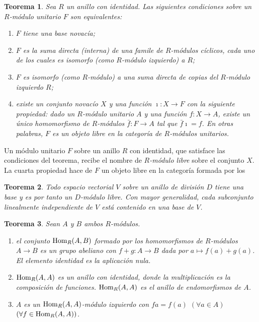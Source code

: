 \documentclass{report}
\newcommand{\Hom}{\textnormal{Hom}}
\newtheorem{theorem}{Teorema}
\begin{document}
  \newpage

  \begin{theorem}
    \label{theorem:freeUnitalModulesOverARingWithIdentity}
    Sea \(R\) un anillo con identidad.
    Las siguientes condiciones sobre un \(R\)-módulo unitario \(F\) son equivalentes:
    \begin{enumerate}
      \item \(F\) tiene una base novacía;
      \item \(F\) es la suma directa (interna) de una famile de \(R\)-módulos cíclicos, cada uno de los cuales es isomorfo (como \(R\)-módulo izquierdo) a \(R\);
      \item \(F\) es isomorfo (como \(R\)-módulo) a una suma directa de copias del \(R\)-módulo izquierdo \(R\);
      \item existe un conjunto novacío \(X\) y una función \(\imath : X \rightarrow F\) con la siguiente propiedad:
      dado un \(R\)-módulo unitario \(A\) y una función \(f : X \rightarrow A\), existe un único homomorfismo de \(R\)-módulos \(\bar{f} : F \rightarrow A\) tal que \(\bar{f} \imath = f\).
      En otras palabras, \(F\) es un objeto libre en la categoría de \(R\)-módulos unitarios.
    \end{enumerate}
  \end{theorem}

  Un módulo unitario \(F\) sobre un anillo \(R\) con identidad, que satisface las condiciones del teorema, recibe el nombre de \emph{\(R\)-módulo libre} sobre el conjunto \(X\).
  La cuarta propiedad hace de \(F\) un objeto libre en la categoría formada por los 

  \begin{theorem}
    \label{theorem:vectorSpaceBasis}
    Todo espacio vectorial \(V\) sobre un anillo de división \(D\) tiene una base y es por tanto un \(D\)-módulo libre.
    Con mayor generalidad, cada subconjunto linealmente independiente de \(V\) está contenido en una base de \(V\).
  \end{theorem}

  \begin{theorem}
    \label{theorem:moduleHomomorphisms}
    Sean \(A\) y \(B\) ambos \(R\)-módulos.
    \begin{enumerate}
      \item el conjunto \(\Hom_R(A, B)\) formado por los homomorfismos de \(R\)-módulos \(A \rightarrow B\) es un grupo abeliano con \(f + g : A \rightarrow B\) dada por \(a \mapsto f(a) + g(a)\).
      El elemento identidad es la aplicación nula.
      \item \(\Hom_R(A, A)\) es un anillo con identidad, donde la multiplicación es la composición de funciones.
      \(\Hom_R(A, A)\) es el \emph{anillo de endomorfismos} de \(A\).
      \item \(A\) es un \(\Hom_R(A, A)\)-módulo izquierdo con \(f a = f(a)\) \((\forall a \in A)\) \((\forall f \in \Hom_R(A, A))\).
    \end{enumerate}
  \end{theorem}
\end{document}
